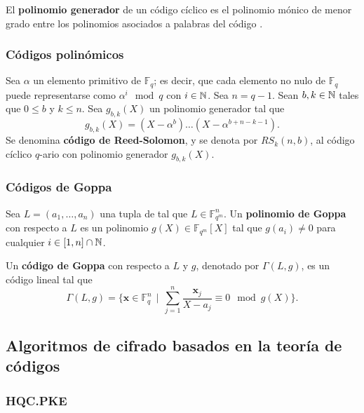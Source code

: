 \begin{definition}
	El \textbf{polinomio generador} de un código cíclico es el polinomio mónico de menor grado entre los polinomios asociados a palabras del código \autocite{VERLINDE2003203}.
\end{definition}

\subsubsection{Códigos polinómicos}

\begin{definition}
	Sea $\alpha$ un elemento primitivo de $\mathbb{F}_q$; es decir, que cada elemento no nulo de $\mathbb{F}_q$ puede representarse como $\alpha^i \mod q$ con $i \in \mathbb{N}$. Sea $n = q - 1$. Sean $b, k \in \mathbb{N}$ tales que $0 \leq b$ y $k \leq n$. Sea $g_{b,k}(X)$ un polinomio generador tal que
	\[g_{b,k}(X) = (X - \alpha^b)\hdots(X - \alpha^{b+n-k-1}).\]
	Se denomina \textbf{código de Reed-Solomon}, y se denota por $RS_k(n, b)$, al código cíclico $q$-ario con polinomio generador $g_{b,k}(X)$.
\end{definition}

\subsubsection{Códigos de Goppa}

\begin{definition}
	Sea $L = (a_1, \dots, a_n)$ una tupla de tal que $L \in \mathbb{F}_{q^m}^n$. Un \textbf{polinomio de Goppa} con respecto a $L$ es un polinomio $g(X) \in \mathbb{F}_{q^m}[X]$ tal que $g(a_i) \neq 0$ para cualquier $i \in [1, n] \cap \mathbb{N}$.
\end{definition}

\begin{definition}
	Un \textbf{código de Goppa} con respecto a $L$ y $g$, denotado por $\Gamma(L, g)$, es un código lineal tal que
	\[\Gamma(L, g) = \bigg\{\textbf{x} \in \mathbb{F}_q^n \ \ \bigg|\ \ \sum_{j=1}^n \frac{\textbf{x}_j}{X - a_j} \equiv 0 \mod g(X)\bigg\}.\]
\end{definition}

\subsection{Algoritmos de cifrado basados en la teoría de códigos}

\subsubsection{HQC.PKE}

